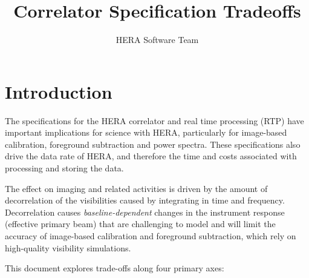 \documentclass{article}
\begin{document}
\author{HERA Software Team}
\title{Correlator Specification Tradeoffs}
\maketitle

\setcounter{section}{-1}
\section*{Introduction}
The specifications for the HERA correlator and real time processing (RTP) have important implications for science with HERA, particularly for image-based calibration, foreground subtraction and power spectra. These specifications also drive the data rate of HERA, and therefore the time and costs associated with processing and storing the data.

The effect on imaging and related activities is driven by the amount of decorrelation of the visibilities caused by integrating in time and frequency. Decorrelation causes \textit{baseline-dependent} changes in the instrument response (effective primary beam) that are challenging to model and will limit the accuracy of image-based calibration and foreground subtraction, which rely on high-quality visibility simulations.

This document explores trade-offs along four primary axes:
\end{document}
